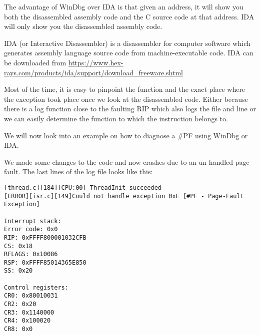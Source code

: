 \begin{appendices}
\begin{tcolorbox}[width=\textwidth,colback={yellow},title={WinDbg},colbacktitle=yellow,coltitle=black]
	The advantage of WinDbg over IDA is that given an address, it will show you both the disassembled assembly code
	and the C source code at that address. IDA will only show you the disassembled assembly code.
 \end{tcolorbox}    

 \begin{tcolorbox}[width=\textwidth,colback={green},title={IDA},colbacktitle=green,coltitle=black]    
	IDA (or Interactive Disassembler) is a disassembler for computer software which generates 
	assembly language source code from machine-executable code.
	IDA can be downloaded from \url{https://www.hex-rays.com/products/ida/support/download_freeware.shtml}
 \end{tcolorbox}    

Most of the time, it is easy to pinpoint the function and the exact place where the exception took
place once we look at the disassembled code. Either because there is a log function close to the
faulting RIP which also logs the file and line or we can easily determine the function to which the
instruction belongs to.

We will now look into an example on how to diagnose a \#PF using WinDbg or IDA.

We made some changes to the code and now \projectname crashes due to an un-handled page fault. The
last lines of the log file looks like this:
\begin{verbatim}
[thread.c][184][CPU:00]_ThreadInit succeeded
[ERROR][isr.c][149]Could not handle exception 0xE [#PF - Page-Fault Exception]

Interrupt stack:
Error code: 0x0
RIP: 0xFFFF800001032CFB
CS: 0x18
RFLAGS: 0x10086
RSP: 0xFFFF85014365E850
SS: 0x20

Control registers:
CR0: 0x80010031
CR2: 0x20
CR3: 0x1140000
CR4: 0x100020
CR8: 0x0


\end{verbatim}
\end{appendices}

